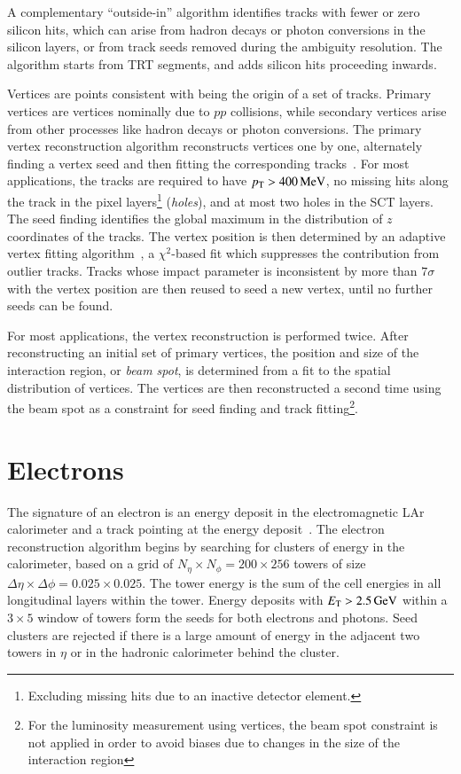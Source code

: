 A complementary ``outside-in'' algorithm identifies tracks with fewer or zero silicon hits, which can arise from hadron decays or photon conversions in the silicon layers, or from track seeds removed during the ambiguity resolution. The algorithm starts from TRT segments, and adds silicon hits proceeding inwards. 

Vertices are points consistent with being the origin of a set of tracks. Primary vertices are vertices nominally due to $pp$ collisions, while secondary vertices arise from other processes like hadron decays or photon conversions. The primary vertex reconstruction algorithm reconstructs vertices one by one, alternately finding a vertex seed and then fitting the corresponding tracks~\cite{TheATLASCollaboration:2010wy,TheATLASCollaboration:2012tja}. For most applications, the tracks are required to have $p_{\text{T}}>\SI{400}{\mega\electronvolt}$, no missing hits along the track in the pixel layers\footnote{Excluding missing hits due to an inactive detector element.} (\emph{holes}), and at most two holes in the SCT layers. The seed finding identifies the global maximum in the distribution of $z$ coordinates of the tracks. The vertex position is then determined by an adaptive vertex fitting algorithm~\cite{Waltenberger:2007hz}, a $\chi^2$-based fit which suppresses the contribution from outlier tracks. Tracks whose impact parameter is inconsistent by more than $7\sigma$ with the vertex position are then reused to seed a new vertex, until no further seeds can be found. 

For most applications, the vertex reconstruction is performed twice. After reconstructing an initial set of primary vertices, the position and size of the interaction region, or \emph{beam spot}, is determined from a fit to the spatial distribution of vertices. The vertices are then reconstructed a second time using the beam spot as a constraint for seed finding and track fitting\footnote{For the luminosity measurement using vertices, the beam spot constraint is not applied in order to avoid biases due to changes in the size of the interaction region}.

\section{Electrons}\label{sec:event-reconstruction-electrons}
The signature of an electron is an energy deposit in the electromagnetic LAr calorimeter and a track pointing at the energy deposit~\cite{TheATLASCollaboration:2014fu,TheATLASCollaboration:2014vz}. The electron reconstruction algorithm begins by searching for clusters of energy in the calorimeter, based on a grid of $N_{\eta}\times N_{\phi}=200\times256$ towers of size $\Delta\eta\times\Delta\phi = 0.025\times0.025$. The tower energy is the sum of the cell energies in all longitudinal layers within the tower. Energy deposits with $E_{\mathrm{T}}>\SI{2.5}{\giga\electronvolt}$ within a $3\times 5$ window of towers form the seeds for both electrons and photons. Seed clusters are rejected if there is a large amount of energy in the adjacent two towers in $\eta$ or in the hadronic calorimeter behind the cluster. 

